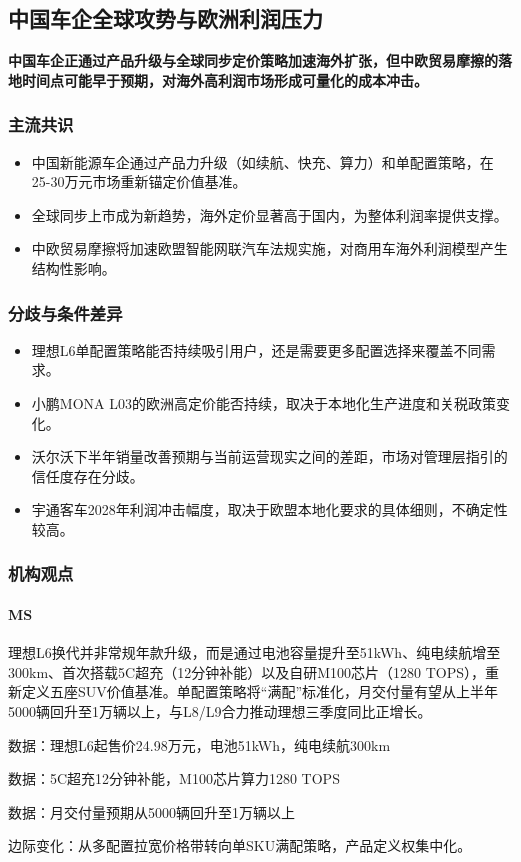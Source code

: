 \documentclass[11pt]{ctexart}
\begin{document}
\subsection{中国车企全球攻势与欧洲利润压力}
\textbf{中国车企正通过产品升级与全球同步定价策略加速海外扩张，但中欧贸易摩擦的落地时间点可能早于预期，对海外高利润市场形成可量化的成本冲击。}
\subsubsection*{主流共识}
\begin{itemize}
  \item 中国新能源车企通过产品力升级（如续航、快充、算力）和单配置策略，在25-30万元市场重新锚定价值基准。
  \item 全球同步上市成为新趋势，海外定价显著高于国内，为整体利润率提供支撑。
  \item 中欧贸易摩擦将加速欧盟智能网联汽车法规实施，对商用车海外利润模型产生结构性影响。
\end{itemize}
\subsubsection*{分歧与条件差异}
\begin{itemize}
  \item 理想L6单配置策略能否持续吸引用户，还是需要更多配置选择来覆盖不同需求。
  \item 小鹏MONA L03的欧洲高定价能否持续，取决于本地化生产进度和关税政策变化。
  \item 沃尔沃下半年销量改善预期与当前运营现实之间的差距，市场对管理层指引的信任度存在分歧。
  \item 宇通客车2028年利润冲击幅度，取决于欧盟本地化要求的具体细则，不确定性较高。
\end{itemize}
\subsubsection*{机构观点}
\paragraph{MS} 理想L6换代并非常规年款升级，而是通过电池容量提升至51kWh、纯电续航增至300km、首次搭载5C超充（12分钟补能）以及自研M100芯片（1280 TOPS），重新定义五座SUV价值基准。单配置策略将“满配”标准化，月交付量有望从上半年5000辆回升至1万辆以上，与L8/L9合力推动理想三季度同比正增长。
{\small\color{refgray}数据：理想L6起售价24.98万元，电池51kWh，纯电续航300km\par}
{\small\color{refgray}数据：5C超充12分钟补能，M100芯片算力1280 TOPS\par}
{\small\color{refgray}数据：月交付量预期从5000辆回升至1万辆以上\par}
{\small\color{refgray}边际变化：从多配置拉宽价格带转向单SKU满配策略，产品定义权集中化。\par}
\end{document}
